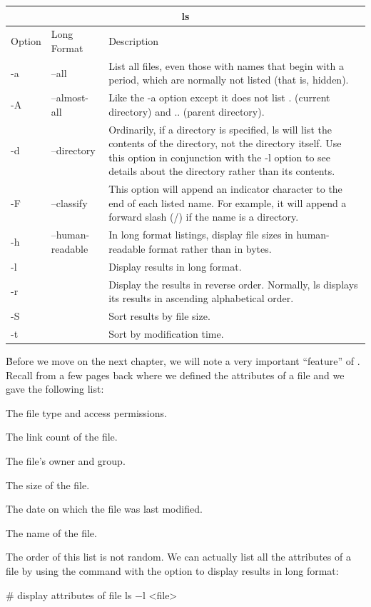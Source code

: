 \begin{tabular}{ |p{1cm}|p{3cm}||p{10.6cm}| }
\hline
\multicolumn{3}{|c|}{ls} \\
\hline
Option& Long Format& Description\\
\hline
-a & --all & List all files, even those with names that begin with a period, which are normally not listed (that is, hidden).\\
-A & --almost-all & Like the -a option except it does not list . (current directory) and .. (parent directory).\\
-d & --directory & Ordinarily, if a directory is specified, ls will list the contents of the directory, not the directory itself. Use this option in conjunction with the -l option to see details about the directory rather than its contents.\\
-F & --classify & This option will append an indicator character to the end of each listed name. For example, it will append a forward slash (/) if the name is a directory.\\
-h & --human-readable & In long format listings, display file sizes in human-readable format rather than in bytes.\\
-l  & & Display results in long format.\\
-r & & Display the results in reverse order. Normally, ls displays its results in ascending alphabetical order.\\
-S  & & Sort results by file size.\\
-t  & & Sort by modification time.\\
\hline
\end{tabular}

\v

Before we move on the next chapter, we will note a very important ``feature'' of . Recall from a few pages back
where we defined the attributes of a file and we gave the following list:
\bit
\item The file type and access permissions.
\item The link count of the file.
\item The file's owner and group.
\item The size of the file.
\item The date on which the file was last modified.
\item The name of the file.
\eit

The order of this list is not random. We can actually list all the attributes of a file by using the  command
with the option  to display results in long format:
\begin{bash}
# display attributes of file
ls $-$l <file>
\end{bash}

